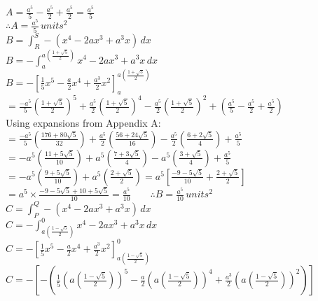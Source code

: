 \documentclass{homework}
\begin{document}
\begin{flushleft}
\begin{paracol}{2}
$A=\frac{a^5}{5}-\frac{a^5}{2}+\frac{a^5}{2}=\frac{a^5}{5}$ \vspace{0.5em} \\
$\therefore A=\frac{a^5}{5} \, units^2$ \vspace{0.5em} \\
\switchcolumn
$B=\int_R^S-(x^4-2ax^3+a^3x)\, dx$ \vspace{0.5em} \\
$B=-\int_a^{a(\frac{1 + \sqrt{5}}{2})}x^4-2ax^3+a^3x\, dx$ \vspace{0.5em} \\
$B=-[\frac{1}{5}x^5-\frac{a}{2}x^4+\frac{a^3}{2}x^2]_a^{a(\frac{1 + \sqrt{5}}{2})}$ \vspace{0.3em} \\
$=\frac{-a^5}{5}(\frac{1 + \sqrt{5}}{2})^5+\frac{a^5}{2}(\frac{1 + \sqrt{5}}{2})^4-\frac{a^5}{2}(\frac{1 + \sqrt{5}}{2})^2+(\frac{a^5}{5}-\frac{a^5}{2}+\frac{a^5}{2})$ \vspace{0.03em}\\
Using expansions from Appendix A: \vspace{0.3em}\\
$=\frac{-a^5}{5}(\frac{176 + 80 \sqrt{5}}{32})+\frac{a^5}{2}(\frac{56 + 24\sqrt{5}}{16})-\frac{a^5}{2}(\frac{6 + 2\sqrt{5}}{4})+\frac{a^5}{5}$ \vspace{0.5em} \\
$=-a^5(\frac{11 + 5\sqrt{5}}{10})+a^5(\frac{7 + 3\sqrt{5}}{4})-a^5(\frac{3 + \sqrt{5}}{4})+\frac{a^5}{5}$ \vspace{0.5em} \\
$=-a^5(\frac{9+5 \sqrt{5}}{10})+a^5(\frac{2+\sqrt{5}}{2})=a^5[\frac{-9-5 \sqrt{5}}{10}+\frac{2+\sqrt{5}}{2}]$\vspace{0.5em} \\
$=a^5\times \frac{-9-5\sqrt{5}+10+5\sqrt{5}}{10}=\frac{a^5}{10} \hspace{2em}\therefore B=\frac{a^5}{10}\, units^2$ \vspace{0.2em} \\
\switchcolumn
\newpage
$C=\int_P^Q -(x^4-2ax^3+a^3x)\, dx $ \vspace{0.5em} \\ 
$C=-\int_{a(\frac{1-\sqrt{5}}{2})}^0 x^4-2ax^3+a^3x\, dx $ \vspace{0.5em} \\ 
$C=-[\frac{1}{5}x^5-\frac{a}{2}x^4+\frac{a^3}{2}x^2]_{a(\frac{1-\sqrt{5}}{2})}^{0}$ \vspace{0.5em} \\
$C=-[-(\frac{1}{5}(a(\frac{1-\sqrt{5}}{2}))^5-\frac{a}{2}(a(\frac{1-\sqrt{5}}{2}))^4+\frac{a^3}{2}(a(\frac{1-\sqrt{5}}{2}))^2)]$ \vspace{0.2em} \\

\end{paracol}
\end{flushleft}
\end{document}

